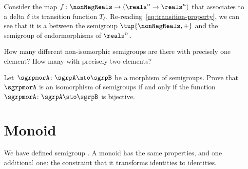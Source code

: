 \begin{example}
  Consider the map $f: \nonNegReals \to (\reals^n \to \reals^n)$ that associates to a delta $\delta$
  its transition function $T_\delta$.
  Re-reading~\cref{eq:transition-property}, we can see that it is a \whomo between the semigroup $\tup{\nonNegReals,+}$ and the semigroup of endormorphisms of $\reals^n$.
\end{example}




\begin{exercise}
  \label{ex:non-isomorphic}
  How many different non-isomorphic semigroups are there with precisely one element?
  How many with precisely two elements?
\end{exercise}
\begin{solution}
\end{solution}

\begin{exercise}
  \label{ex:semi-morph}
  Let~$\sgrpmorA\colon \sgrpA \mto \sgrpB$ be a morphism of semigroups.
  Prove that~$\sgrpmorA$ is an isomorphism of semigroups if and only if the function~$\sgrpmorA\colon \sgrpA \sto \sgrpB$ is bijective.
\end{exercise}
\begin{solution}
\end{solution}


\section{Monoid \whomos}

%
%
%

We have defined semigroup \whomo. A monoid \whomo has the same properties, and one additional one: the constraint that it transforms identities to identities.

